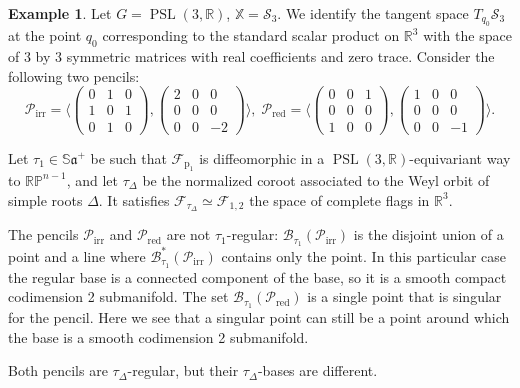 \documentclass[reqno,10pt]{amsart}
\theoremstyle{plain}
\theoremstyle{definition}
\newtheorem{exmp}[thm]{Example}
\theoremstyle{remark}
\newcommand{\type}{\tau}
\newcommand{\R}{\mathbb{R}}
\newcommand{\Sph}{\mathbb{S}}
\DeclareMathOperator{\PSL}{PSL}
\newcommand{\X}{\mathbb{X}}
\begin{document}
\begin{exmp}
\label{exmp:PencilsRegular}
Let $G=\PSL(3,\R)$, $\X=\mathcal{S}_3$. We identify the tangent space $T_{q_0}\mathcal{S}_3$ at the point $q_0$ corresponding to the standard scalar product on $\R^3$ with the space of $3$ by $3$ symmetric matrices with real coefficients  and zero trace. Consider the following two pencils:
$$\mathcal{P}_\text{irr}=\langle\begin{pmatrix}
0& 1 &0 \\
1&0  &1 \\
0&  1& 0
\end{pmatrix}, \begin{pmatrix}
2& 0 &0 \\
0&0  &0 \\
0&  0& -2\end{pmatrix}\rangle,\; \mathcal{P}_\text{red}=\langle\begin{pmatrix}
0& 0 &1 \\
0&0  &0 \\
1&  0& 0
\end{pmatrix}, \begin{pmatrix}
1& 0 & 0\\
0&0  &0 \\
0&  0& -1\end{pmatrix}\rangle.$$ 

Let $\type_1\in \Sph\mathfrak{a}^+$ be such that $\mathcal{F}_\mathrm{p_1}$ is diffeomorphic in a $\PSL(3,\R)$-equivariant way to $\mathbb{RP}^{n-1}$, and let $\type_\Delta$ be the normalized coroot associated to the Weyl orbit of simple roots  $\Delta$. It satisfies $\mathcal{F}_{\type_\Delta}\simeq \mathcal{F}_{1,2}$ the space of complete flags in $\R^3$.

The pencils $\mathcal{P}_\text{irr}$ and $\mathcal{P}_\text{red}$ are not $\type_1$-regular: $\mathcal{B}_{\type_1}(\mathcal{P}_\text{irr})$ is the disjoint union of a point and a line where $\mathcal{B}^*_{\type_1}(\mathcal{P}_\text{irr})$ contains only the point. In this particular case the regular base is a connected component of the base, so it is a smooth compact codimension 2 submanifold. 
The set $\mathcal{B}_{\type_1}(\mathcal{P}_\text{red})$ is a single point that is singular for the pencil. Here we see that a singular point can still be a point around which the base is a smooth codimension 2 submanifold. 

\smallskip

Both pencils are $\type_\Delta$-regular, but their $\type_\Delta$-bases are different.


\end{exmp}
\end{document}
